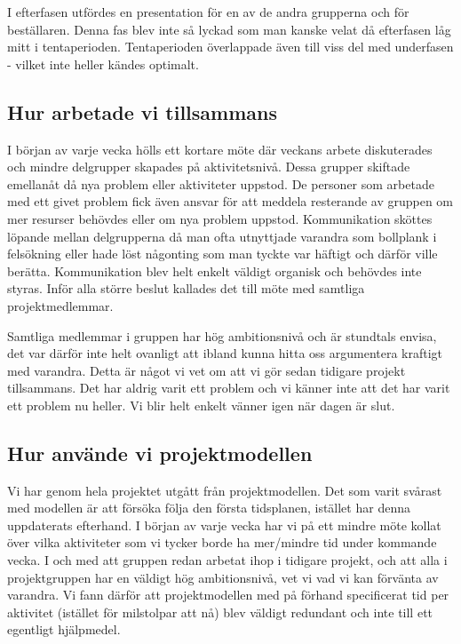 \documentclass[a4paper,12pt,fleqn]{article}
\begin{document}
I efterfasen utfördes en presentation för en av de andra grupperna och för beställaren. Denna fas blev inte så lyckad som man kanske velat då efterfasen låg mitt i tentaperioden. Tentaperioden överlappade även till viss del med underfasen - vilket inte heller kändes optimalt. 


\subsection{Hur arbetade vi tillsammans}
I början av varje vecka hölls ett kortare möte där veckans arbete diskuterades och mindre delgrupper skapades på aktivitetsnivå. Dessa grupper skiftade emellanåt då nya problem eller aktiviteter uppstod. De personer som arbetade med ett givet problem fick även ansvar för att meddela resterande av gruppen om mer resurser behövdes eller om nya problem uppstod. Kommunikation sköttes löpande mellan delgrupperna då man ofta utnyttjade varandra som bollplank i felsökning eller hade löst någonting som man tyckte var häftigt och därför ville berätta. Kommunikation blev helt enkelt väldigt organisk och behövdes inte styras. 
Inför alla större beslut kallades det till möte med samtliga projektmedlemmar.

Samtliga medlemmar i gruppen har hög ambitionsnivå och är stundtals envisa, det var därför inte helt ovanligt att ibland kunna hitta oss argumentera kraftigt med varandra. Detta är något vi vet om att vi gör sedan tidigare projekt tillsammans. Det har aldrig varit ett problem och vi känner inte att det har varit ett problem nu heller. Vi blir helt enkelt vänner igen när dagen är slut. 

\subsection{Hur använde vi projektmodellen}
Vi har genom hela projektet utgått från projektmodellen. Det som varit svårast med modellen är att försöka följa den första tidsplanen, istället har denna uppdaterats efterhand. I början av varje vecka har vi på ett mindre möte kollat över vilka aktiviteter som vi tycker borde ha mer/mindre tid under kommande vecka. I och med att gruppen redan arbetat ihop i tidigare projekt, och att alla i projektgruppen har en väldigt hög ambitionsnivå, vet vi vad vi kan förvänta av varandra. Vi fann därför att projektmodellen med på förhand specificerat tid per aktivitet (istället för milstolpar att nå) blev väldigt redundant och inte till ett egentligt hjälpmedel. 
\end{document}
